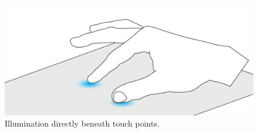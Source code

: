\begin{figure}[h]
  \centering
  \begin{minipage}[b]{.8\textwidth}
    \centering
    \includegraphics[width=.7\linewidth]{figures/touch/evaluation/backlid_textile}
  \caption[Illumination directly beneath touch points.]
  {Illumination directly beneath touch points.}
  \label{fig:textiletouch:eval:backlighting}
  \end{minipage}
\end{figure}

